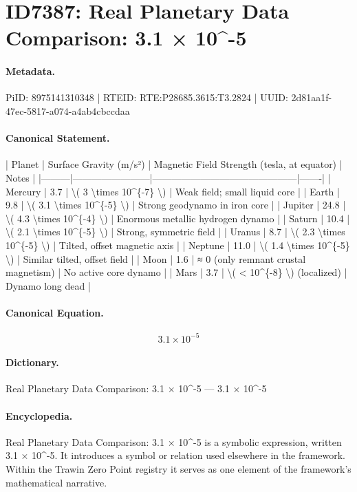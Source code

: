 \section*{ID7387: Real Planetary Data Comparison: 3.1 × 10\textasciicircum{}-5}
\paragraph{Metadata.}
PiID: 8975141310348 | RTEID: RTE:P28685.3615:T3.2824 | UUID: 2d81aa1f-47ec-5817-a074-a4ab4cbccdaa

\paragraph{Canonical Statement.}
| Planet | Surface Gravity (m/s²) | Magnetic Field Strength (tesla, at equator) | Notes | |---------|------------------------|---------------------------------------------|-------| | Mercury | 3.7 | \textbackslash{}( 3 \textbackslash{}times 10\textasciicircum{}\{-7\} \textbackslash{}) | Weak field; small liquid core | | Earth | 9.8 | \textbackslash{}( 3.1 \textbackslash{}times 10\textasciicircum{}\{-5\} \textbackslash{}) | Strong geodynamo in iron core | | Jupiter | 24.8 | \textbackslash{}( 4.3 \textbackslash{}times 10\textasciicircum{}\{-4\} \textbackslash{}) | Enormous metallic hydrogen dynamo | | Saturn | 10.4 | \textbackslash{}( 2.1 \textbackslash{}times 10\textasciicircum{}\{-5\} \textbackslash{}) | Strong, symmetric field | | Uranus | 8.7 | \textbackslash{}( 2.3 \textbackslash{}times 10\textasciicircum{}\{-5\} \textbackslash{}) | Tilted, offset magnetic axis | | Neptune | 11.0 | \textbackslash{}( 1.4 \textbackslash{}times 10\textasciicircum{}\{-5\} \textbackslash{}) | Similar tilted, offset field | | Moon | 1.6 | ≈ 0 (only remnant crustal magnetism) | No active core dynamo | | Mars | 3.7 | \textbackslash{}( < 10\textasciicircum{}\{-8\} \textbackslash{}) (localized) | Dynamo long dead |

\paragraph{Canonical Equation.}
\[
3.1 \times 10^{-5}
\]

\paragraph{Dictionary.}
Real Planetary Data Comparison: 3.1 × 10\textasciicircum{}-5 — 3.1 × 10\textasciicircum{}-5

\paragraph{Encyclopedia.}
Real Planetary Data Comparison: 3.1 × 10\textasciicircum{}-5 is a symbolic expression, written 3.1 × 10\textasciicircum{}-5. It introduces a symbol or relation used elsewhere in the framework. Within the Trawin Zero Point registry it serves as one element of the framework's mathematical narrative.

